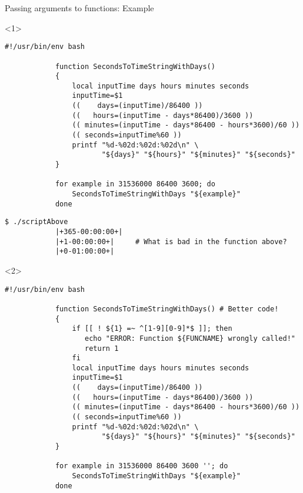 \begin{frame}[fragile]{Passing arguments to functions: Example}
    \vspace{-2mm}
    \begin{onlyenv}<1>
        \begin{lstlisting}[style=MyBash]
            #!/usr/bin/env bash

            function SecondsToTimeStringWithDays()
            {
                local inputTime days hours minutes seconds
                inputTime=$1
                ((    days=(inputTime)/86400 ))
                ((   hours=(inputTime - days*86400)/3600 ))
                (( minutes=(inputTime - days*86400 - hours*3600)/60 ))
                (( seconds=inputTime%60 ))
                printf "%d-%02d:%02d:%02d\n" \
                       "${days}" "${hours}" "${minutes}" "${seconds}"
            }

            for example in 31536000 86400 3600; do
                SecondsToTimeStringWithDays "${example}"
            done
        \end{lstlisting}
        \begin{lstlisting}[style=MyBash, aboveskip=2mm, firstnumber=18]
            $ ./scriptAbove
            |+365-00:00:00+|
            |+1-00:00:00+|     # What is bad in the function above?
            |+0-01:00:00+|
        \end{lstlisting}
    \end{onlyenv}
    \begin{onlyenv}<2>
        \begin{lstlisting}[style=MyBash, firstnumber=22]
            #!/usr/bin/env bash

            function SecondsToTimeStringWithDays() # Better code!
            {
                if [[ ! ${1} =~ ^[1-9][0-9]*$ ]]; then
                   echo "ERROR: Function ${FUNCNAME} wrongly called!"
                   return 1
                fi
                local inputTime days hours minutes seconds
                inputTime=$1
                ((    days=(inputTime)/86400 ))
                ((   hours=(inputTime - days*86400)/3600 ))
                (( minutes=(inputTime - days*86400 - hours*3600)/60 ))
                (( seconds=inputTime%60 ))
                printf "%d-%02d:%02d:%02d\n" \
                       "${days}" "${hours}" "${minutes}" "${seconds}"
            }

            for example in 31536000 86400 3600 ''; do
                SecondsToTimeStringWithDays "${example}"
            done
        \end{lstlisting}
    \end{onlyenv}
\end{frame}
